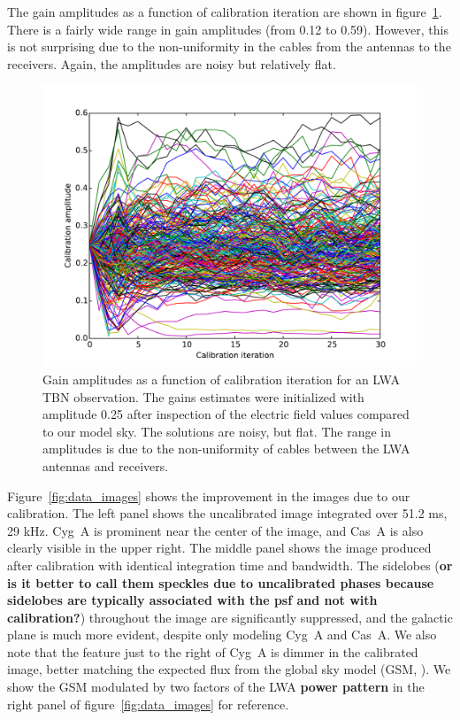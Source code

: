 \documentclass[a4paper,fleqn,usenatbib]{../mnras}
\begin{document}
The gain amplitudes as a function of calibration iteration are shown in figure~\ref{fig:data_amp}. There is a fairly wide range in gain amplitudes (from 0.12 to 0.59). However, this is not surprising due to the non-uniformity in the cables from the antennas to the receivers. Again, the amplitudes are noisy but relatively flat.

\begin{figure}
\begin{center}
\includegraphics[width=\columnwidth]{figures/cal_paper_data_amps.pdf}
\caption{Gain amplitudes as a function of calibration iteration for an LWA TBN observation. The gains estimates were initialized with amplitude 0.25 after inspection of the electric field values compared to our model sky. The solutions are noisy, but flat. The range in amplitudes is due to the non-uniformity of cables between the LWA antennas and receivers.
}
\label{fig:data_amp}
\end{center}
\end{figure}

Figure~\ref{fig:data_images} shows the improvement in the images due to our calibration. The left panel shows the uncalibrated image integrated over 51.2 ms, 29 kHz. Cyg~A is prominent near the center of the image, and Cas~A is also clearly visible in the upper right. The middle panel shows the image produced after calibration with identical integration time and bandwidth. The sidelobes ({\bf or is it better to call them speckles due to uncalibrated phases because sidelobes are typically associated with the psf and not with calibration?}) throughout the image are significantly suppressed, and the galactic plane is much more evident, despite only modeling Cyg~A and Cas~A. We also note that the feature just to the right of Cyg~A is dimmer in the calibrated image, better matching the expected flux from the global sky model (GSM, \citealt{deo08}). We show the GSM modulated by two factors of the LWA {\bf power pattern} in the right panel of figure~\ref{fig:data_images} for reference.
\end{document}
